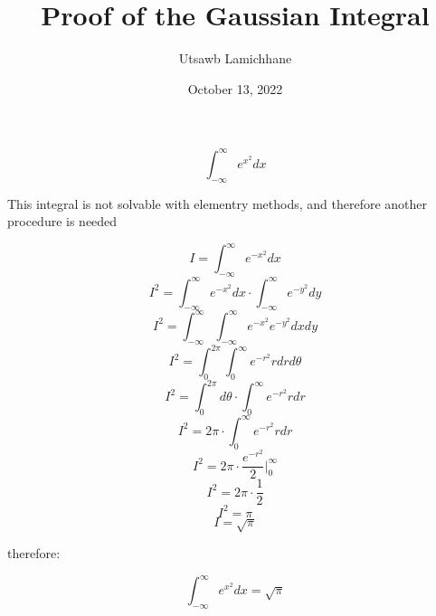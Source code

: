 \documentclass[12pt, letterpaper]{article}
\title{Proof of the Gaussian Integral}
\author{Utsawb Lamichhane}
\date{October 13, 2022}
\begin{document}
    \maketitle
    \[ \int_{-\infty}^{\infty} {e^{x^2}} {dx} \]

    This integral is not solvable with elementry methods,
    and therefore another procedure is needed

    \[ I = \int_{-\infty}^{\infty} {e^{-x^2}} {dx} \]
    \[ I^2 = \int_{-\infty}^{\infty} {e^{-x^2}} {dx} \cdot \int_{-\infty}^{\infty} {e^{-y^2}} {dy} \]
    \[ I^2 = \int_{-\infty}^{\infty} \int_{-\infty}^{\infty} {e^{-x^2}} {e^{-y^2}} {dx}{dy} \]
    \[ I^2 = \int_{0}^{2\pi} \int_0^\infty {e^{-r^2}}r{dr}{d\theta} \]
    \[ I^2 = \int_{0}^{2\pi} {d\theta} \cdot \int_{0}^{\infty} {e^{-r^2}} r{dr} \]
    \[ I^2 = {2\pi} \cdot \int_{0}^{\infty} {e^{-r^2}} r{dr} \]
    \[ I^2 = {2\pi} \cdot \left. \frac{e^{-r^2}}{2} \bigg|_{0}^{\infty} \right. \]
    \[ I^2 = {2\pi} \cdot \frac{1}{2} \]
    \[ I^2 = \pi \]
    \[ I = \sqrt{\pi} \]

    therefore:

    \[ \int_{-\infty}^{\infty} {e^{x^2}} {dx} = \sqrt{\pi}\]
    
\end{document}
